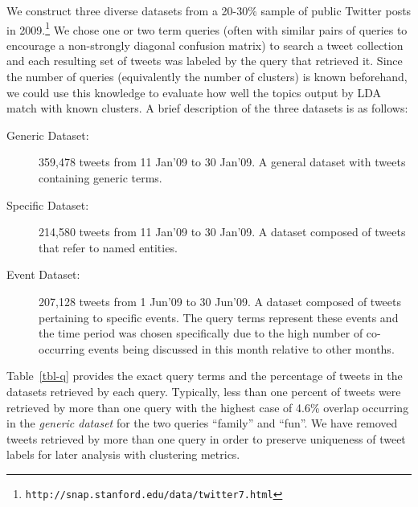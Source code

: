 \documentclass{sig-alternate}
\begin{document}
We construct three diverse datasets from a 20-30\% sample of public
Twitter posts in 2009.\footnote{\texttt{http://snap.stanford.edu/data/twitter7.html}}
We chose one or two term queries (often
with similar pairs of queries to encourage a non-strongly diagonal
confusion matrix) to search a tweet collection and each resulting set
of tweets was labeled by the query that retrieved it.  Since the
number of queries (equivalently the number of clusters) is known
beforehand, we could use this knowledge to evaluate how well the
topics output by LDA match with known clusters. A brief description of
the three datasets is as follows:
\begin{description}
\item[Generic Dataset: ] 359,478 tweets from 11 Jan'09 to 30 Jan'09.  A
  general dataset with tweets containing generic terms.\vspace{-5pt}
\item[Specific Dataset: ] 214,580 tweets from 11 Jan'09 to 30 Jan'09.
  A dataset composed of tweets %
  that refer to named entities.\vspace{-5pt}
\item[Event Dataset: ] 207,128 tweets from 1 Jun'09 to 30 Jun'09.  A
  dataset composed of tweets pertaining to specific events.  The query
  terms represent these events and the time period was chosen
  specifically due to the high number of co-occurring events being
  discussed in this month relative to other months.
\end{description}

Table~\ref{tbl-q} provides the exact query terms and the percentage of
tweets in the datasets retrieved by each query.  Typically, less than
one percent of tweets were retrieved by more than one query with the
highest case of 4.6\% overlap occurring in the \emph{generic dataset}
for the two queries ``family'' and ``fun''.  We have removed tweets
retrieved by more than one query in order to preserve
uniqueness of tweet labels for later analysis with clustering metrics.
\end{document}
